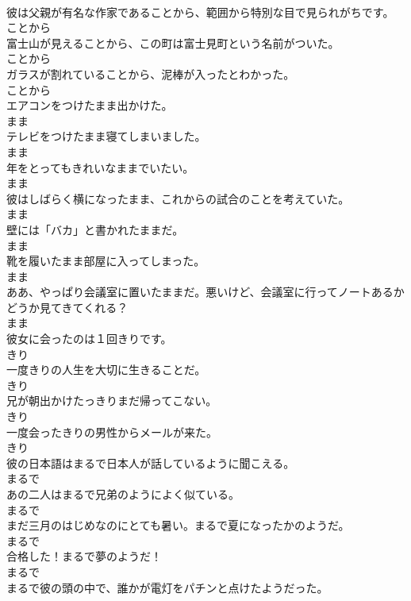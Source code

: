 \documentclass[8pt]{extreport}
\begin{document}
\begin{CJK}{UTF8}{min}
\\	彼は父親が有名な作家であることから、範囲から特別な目で見られがちです。	
\\	ことから	
\\	富士山が見えることから、この町は富士見町という名前がついた。	
\\	ことから	
\\	ガラスが割れていることから、泥棒が入ったとわかった。	
\\	ことから	
\\	エアコンをつけたまま出かけた。	
\\	まま	
\\	テレビをつけたまま寝てしまいました。	
\\	まま	
\\	年をとってもきれいなままでいたい。	
\\	まま	
\\	彼はしばらく横になったまま、これからの試合のことを考えていた。	
\\	まま	
\\	壁には「バカ」と書かれたままだ。	
\\	まま	
\\	靴を履いたまま部屋に入ってしまった。	
\\	まま	
\\	ああ、やっぱり会議室に置いたままだ。悪いけど、会議室に行ってノートあるかどうか見てきてくれる？	
\\	まま	
\\	彼女に会ったのは１回きりです。	
\\	きり	
\\	一度きりの人生を大切に生きることだ。	
\\	きり	
\\	兄が朝出かけたっきりまだ帰ってこない。	
\\	きり	
\\	一度会ったきりの男性からメールが来た。	
\\	きり	
\\	彼の日本語はまるで日本人が話しているように聞こえる。	
\\	まるで	
\\	あの二人はまるで兄弟のようによく似ている。	
\\	まるで	
\\	まだ三月のはじめなのにとても暑い。まるで夏になったかのようだ。	
\\	まるで	
\\	合格した！まるで夢のようだ！	
\\	まるで	
\\	まるで彼の頭の中で、誰かが電灯をパチンと点けたようだった。	

\end{CJK}
\end{document}
